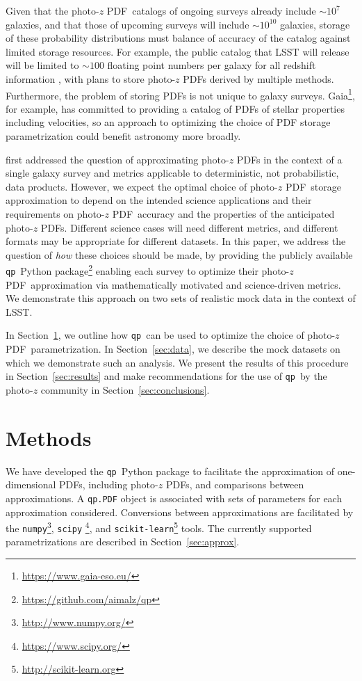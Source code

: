 \documentclass[\docopts]{\docclass}
\newcommand{\qp}{\texttt{qp}}
\newcommand{\pz}{photo-$z$ PDF}
\begin{document}
Given that the \pz\ catalogs of ongoing surveys already include $\sim10^{7}$ 
galaxies, and that those of upcoming surveys will include $\sim10^{10}$ 
galaxies, storage of these probability distributions must balance of accuracy 
of the catalog against limited storage resources.
For example, the public catalog that LSST will release will be limited to 
$\sim100$ floating point numbers per galaxy for all redshift information 
\citep[Section 4.2.2]{juric_data_2017}, with plans to store \pz s derived by 
multiple methods.
Furthermore, the problem of storing PDFs is not unique to galaxy surveys.
Gaia\footnote{\url{https://www.gaia-eso.eu/}}, for example, has committed to 
providing a catalog of PDFs of stellar properties including velocities, so an 
approach to optimizing the choice of PDF storage parametrization could benefit 
astronomy more broadly.

\citet{carrasco_kind_sparse_2014} first addressed the question of approximating 
\pz s in the context of a single galaxy survey and metrics applicable to 
deterministic, not probabilistic, data products.
However, we expect the optimal choice of \pz\ storage approximation to depend 
on the intended science applications and their requirements on \pz\ accuracy 
and the properties of the anticipated \pz s.
Different science cases will need different metrics, and different formats may 
be appropriate for different datasets.
In this paper, we address the question of \textit{how} these choices should be 
made, by providing the publicly available \qp\ Python 
package\footnote{\url{https://github.com/aimalz/qp}} enabling each survey to 
optimize their \pz\ approximation via mathematically motivated and 
science-driven metrics.
We demonstrate this approach on two sets of realistic mock data in the context 
of LSST.

In Section~\ref{sec:methods}, we outline how \qp\ can be used to optimize the 
choice of \pz\ parametrization.
In Section~\ref{sec:data}, we describe the mock datasets on which we 
demonstrate such an analysis.
We present the results of this procedure in Section~\ref{sec:results} and make 
recommendations for the use of \qp\ by the photo-$z$ community in 
Section~\ref{sec:conclusions}.

\section{Methods}
\label{sec:methods}


We have developed the \qp\ Python package to facilitate the approximation of 
one-dimensional PDFs, including \pz s, and comparisons between approximations.
A \texttt{qp.PDF} object is associated with sets of parameters for each 
approximation considered.
Conversions between approximations are facilitated by the 
\texttt{numpy}\footnote{\url{http://www.numpy.org/}}, \texttt{scipy} 
\footnote{\url{https://www.scipy.org/}}, and 
\texttt{scikit-learn}\footnote{\url{http://scikit-learn.org}} 
\citep{pedregosa_scikit-learn:_2011} tools.
The currently supported parametrizations are described in 
Section~\ref{sec:approx}.
\end{document}
